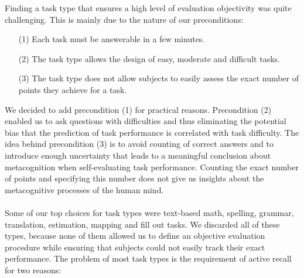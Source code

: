 \documentclass[../main/main.tex]{subfiles}
\begin{document}
	Finding a task type that ensures a high level of evaluation objectivity was quite challenging. This is mainly due to the nature of our preconditions:
	
	\begin{enumerate}
		\item[(1)] Each task must be answerable in a few minutes.
		\item[(2)] The task type allows the design of easy, moderate and difficult tasks.
		\item[(3)] The task type does not allow subjects to easily assess the exact number of points they achieve for a task.
	\end{enumerate}
	
	\noindent We decided to add precondition (1) for practical reasons. Precondition (2) enabled us to ask questions with difficulties and thus eliminating the potential bias that the prediction of task performance is correlated with task difficulty. The idea behind precondition (3) is to avoid counting of correct answers and to introduce enough uncertainty that leads to a meaningful conclusion about metacognition when self-evaluating task performance. Counting the exact number of points and specifying this number does not give us insights about the metacognitive processes of the human mind.
	\\\\
	Some of our top choices for task types were text-based math, spelling, grammar, translation, estimation, mapping and fill out tasks. We discarded all of these types, because none of them allowed us to define an objective evaluation procedure while ensuring that subjects could not easily track their exact performance. The problem of most task types is the requirement of active recall for two reasons:
	
\end{document}
